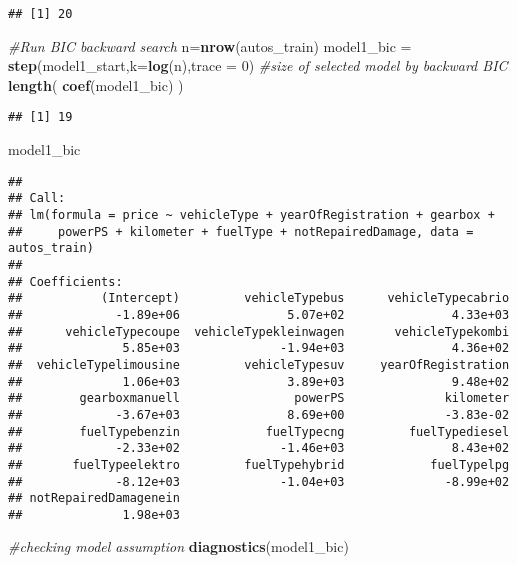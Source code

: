 \documentclass[]{article}
\newenvironment{Shaded}{\begin{snugshade}}{\end{snugshade}}
\newcommand{\CommentTok}[1]{\textcolor[rgb]{0.56,0.35,0.01}{\textit{#1}}}
\newcommand{\DataTypeTok}[1]{\textcolor[rgb]{0.13,0.29,0.53}{#1}}
\newcommand{\DecValTok}[1]{\textcolor[rgb]{0.00,0.00,0.81}{#1}}
\newcommand{\KeywordTok}[1]{\textcolor[rgb]{0.13,0.29,0.53}{\textbf{#1}}}
\newcommand{\NormalTok}[1]{#1}
\newcommand{\StringTok}[1]{\textcolor[rgb]{0.31,0.60,0.02}{#1}}
\begin{document}
\begin{verbatim}
## [1] 20
\end{verbatim}

\begin{Shaded}
\begin{Highlighting}[]
\CommentTok{#Run BIC backward search}
\NormalTok{n=}\KeywordTok{nrow}\NormalTok{(autos_train)}
\NormalTok{model1_bic =}\StringTok{ }\KeywordTok{step}\NormalTok{(model1_start,}\DataTypeTok{k=}\KeywordTok{log}\NormalTok{(n),}\DataTypeTok{trace =} \DecValTok{0}\NormalTok{)}
\CommentTok{#size of selected model by backward BIC}
\KeywordTok{length}\NormalTok{( }\KeywordTok{coef}\NormalTok{(model1_bic) )}
\end{Highlighting}
\end{Shaded}

\begin{verbatim}
## [1] 19
\end{verbatim}

\begin{Shaded}
\begin{Highlighting}[]
\NormalTok{model1_bic}
\end{Highlighting}
\end{Shaded}

\begin{verbatim}
## 
## Call:
## lm(formula = price ~ vehicleType + yearOfRegistration + gearbox + 
##     powerPS + kilometer + fuelType + notRepairedDamage, data = autos_train)
## 
## Coefficients:
##           (Intercept)         vehicleTypebus      vehicleTypecabrio  
##             -1.89e+06               5.07e+02               4.33e+03  
##      vehicleTypecoupe  vehicleTypekleinwagen       vehicleTypekombi  
##              5.85e+03              -1.94e+03               4.36e+02  
##  vehicleTypelimousine         vehicleTypesuv     yearOfRegistration  
##              1.06e+03               3.89e+03               9.48e+02  
##        gearboxmanuell                powerPS              kilometer  
##             -3.67e+03               8.69e+00              -3.83e-02  
##        fuelTypebenzin            fuelTypecng         fuelTypediesel  
##             -2.33e+02              -1.46e+03               8.43e+02  
##       fuelTypeelektro         fuelTypehybrid            fuelTypelpg  
##             -8.12e+03              -1.04e+03              -8.99e+02  
## notRepairedDamagenein  
##              1.98e+03
\end{verbatim}

\begin{Shaded}
\begin{Highlighting}[]
\CommentTok{#checking model assumption}
\KeywordTok{diagnostics}\NormalTok{(model1_bic)}
\end{Highlighting}
\end{Shaded}
\end{document}

